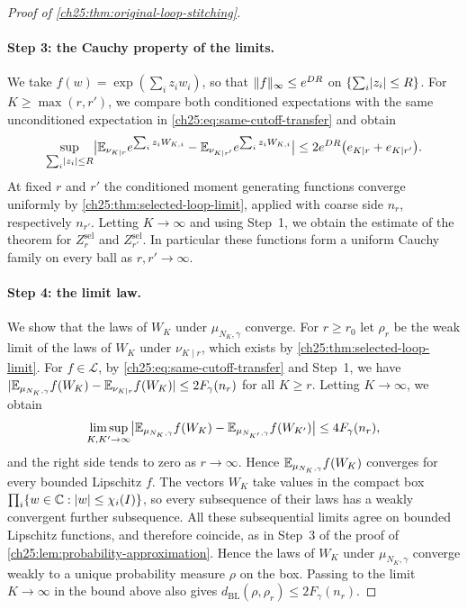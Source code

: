\begin{proof}[Proof of \cref{ch25:thm:original-loop-stitching}]
\paragraph{Step 3: the Cauchy property of the limits.}
We take $f(w)=\exp(\sum_iz_iw_i)$, so that $\lVert f\rVert_\infty\le e^{DR}$ on $\{\sum_i\lvert z_i\rvert\le R\}$. For $K\ge\max(r,r')$, we compare both conditioned expectations with the same unconditioned expectation in \eqref{ch25:eq:same-cutoff-transfer} and obtain
\[
 \sup_{\sum_i\lvert z_i\rvert\le R}\bigl\lvert\mathbb E_{\nu_{K\mid r}}e^{\sum_iz_iW_{K,i}}-\mathbb E_{\nu_{K\mid r'}}e^{\sum_iz_iW_{K,i}}\bigr\rvert\le2e^{DR}\bigl(e_{K\mid r}+e_{K\mid r'}\bigr).
\]
At fixed $r$ and $r'$ the conditioned moment generating functions converge uniformly by \cref{ch25:thm:selected-loop-limit}, applied with coarse side $n_r$, respectively $n_{r'}$. Letting $K\to\infty$ and using Step~1, we obtain the estimate of the theorem for $Z_r^{\mathrm{sel}}$ and $Z_{r'}^{\mathrm{sel}}$. In particular these functions form a uniform Cauchy family on every ball as $r,r'\to\infty$.

\paragraph{Step 4: the limit law.}
We show that the laws of $W_K$ under $\mu_{N_K,\gamma}$ converge. For $r\ge r_0$ let $\rho_r$ be the weak limit of the laws of $W_K$ under $\nu_{K\mid r}$, which exists by \cref{ch25:thm:selected-loop-limit}. For $f\in\mathscr L$, by \eqref{ch25:eq:same-cutoff-transfer} and Step~1, we have $\lvert \mathbb E_{\mu_{N_K,\gamma}}f(W_K)-\mathbb E_{\nu_{K\mid r}}f(W_K)\rvert\le2F_\gamma(n_r)$ for all $K\ge r$. Letting $K\to\infty$, we obtain
\[
 \limsup_{K,K'\to\infty}\bigl\lvert\mathbb E_{\mu_{N_K,\gamma}}f(W_K)-\mathbb E_{\mu_{N_{K'},\gamma}}f(W_{K'})\bigr\rvert\le4F_\gamma(n_r),
\]
and the right side tends to zero as $r\to\infty$. Hence $\mathbb E_{\mu_{N_K,\gamma}}f(W_K)$ converges for every bounded Lipschitz $f$. The vectors $W_K$ take values in the compact box $\prod_i\{w\in\mathbb C:\lvert w\rvert\le\chi_i(I)\}$, so every subsequence of their laws has a weakly convergent further subsequence. All these subsequential limits agree on bounded Lipschitz functions, and therefore coincide, as in Step~3 of the proof of \cref{ch25:lem:probability-approximation}. Hence the laws of $W_K$ under $\mu_{N_K,\gamma}$ converge weakly to a unique probability measure $\rho$ on the box. Passing to the limit $K\to\infty$ in the bound above also gives $d_{\mathrm{BL}}(\rho,\rho_r)\le2F_\gamma(n_r)$.


\end{proof}
